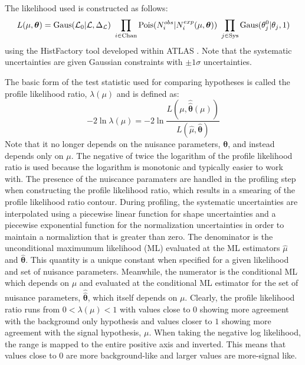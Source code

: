 The likelihood used is constructed as follows:
\begin{equation}
L(\mu,\boldsymbol{\theta}) = \mathrm{Gaus}(\mathcal{L}_0|\mathcal{L},\Delta_{\mathcal{L}})~\prod_{i\in\mathrm{Chan}} \mathrm{Pois}(N_i^{obs}|N_i^{exp}(\mu,\boldsymbol{\theta}))~\prod_{j\in\mathrm{Sys}} \mathrm{Gaus}(\theta_j^0|\theta_j,1)
\label{eq:poisson_likelihood}
\end{equation}
using the HistFactory tool developed within ATLAS \cite{Cranmer:1456844}. Note that the systematic uncertainties are given Gaussian constraints with $\pm1\sigma$ uncertainties.

The basic form of the 
test statistic used for comparing hypotheses is called the profile likelihood 
ratio, $\lambda(\mu)$ and is defined as:
\begin{equation}
-2 \ln \lambda(\mu) = -2 \ln \frac{L(\mu,\hat{\hat{\boldsymbol{\theta}}}(\mu))}{L(\hat{\mu},\hat{\boldsymbol{\theta}})}
\label{eq:profile_likelihood_ratio}
\end{equation}
Note that it no longer depends on the nuisance parameters, $\boldsymbol{\theta}$,
and instead depends only on $\mu$. 
The negative of twice the logarithm of the profile likelihood ratio is used because
the logarithm is monotonic and typically easier to work with.
The presence of the nuiscance paramaters are handled in the profiling 
step when constructing the profile likelihood ratio,  which results 
in a smearing of the profile likelihood ratio contour. 
During profiling, the systematic uncertainties are
interpolated using a piecewise linear function for shape uncertainties
and a piecewise exponential function for the normalization uncertainties
in order to maintain a normaliztion that is greater than zero.
The denominator is the 
unconditional maximumum likelihood (ML)
evaluated at the ML estimators $\hat{\mu}$ and $\hat{\boldsymbol{\theta}}$.
This quantity is a unique constant when specified for a given likelihood
and set of nuisance parameters.
Meanwhile, the numerator is the conditional ML which depends on $\mu$ and
evaluated at 
the conditional ML estimator for the set of nuisance parameters, 
$\hat{\hat{\boldsymbol{\theta}}}$, which itself depends on $\mu$.
Clearly, the profile likelihood ratio runs from $0 < \lambda(\mu) < 1$
with values close to $0$ showing more agreement with the background only hypothesis and values closer to $1$ showing more agreement with the signal hypothesis, $\mu$. 
When taking the negative log likelihood, the range
is mapped to the entire positive axis and inverted. This means
that values close to $0$ are more background-like and larger values are more-signal
like.  

